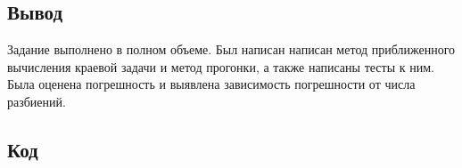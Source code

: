 \documentclass[a4paper,12pt]{article}
\begin{document}
	\subsection{Вывод}
	Задание выполнено в полном объеме.
	Был написан написан метод приближенного вычисления краевой задачи и метод прогонки, а также написаны тесты к ним.
	Была оценена погрешность и выявлена зависимость погрешности от числа разбиений.
	\newpage
	\subsection{Код}
	\inputminted{c++}{../lab1/src/main.cpp}
	\inputminted{c++}{../lab1/src/data_table.hpp}
	\inputminted{c++}{../lab1/include/tma.hpp}
	\inputminted{c++}{../lab1/include/balance.hpp}
	\inputminted{c++}{../lab1/include/utils.hpp}
	\inputminted{c++}{../lab1/include/utils/balance_utils.hpp}
	\inputminted{c++}{../lab1/include/utils/data.hpp}
	\inputminted{c++}{../lab1/include/utils/grid.hpp}
	\inputminted{c++}{../lab1/test/test_tma.cpp}
	\inputminted{c++}{../lab1/test/test_utils.hpp}
\end{document}
